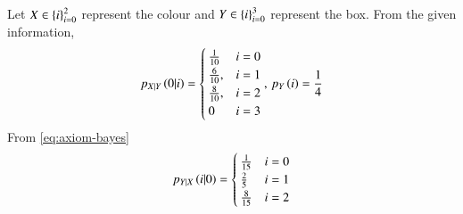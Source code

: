 Let $X\in\left\{i\right\}_{i=0}^{2}$ represent the colour and
$Y\in\left\{i\right\}_{i=0}^{3}$ represent the box.
From the given information,
\begin{align}
	p_{X|Y}\left(0|i\right)=
	\begin{cases}
		\frac{1}{10} & i=0\\
\frac{6}{10},& i=1\\
\frac{8}{10},& i=2\\
0& i=3
\end{cases}
,\,
	p_{Y}\left(i\right)=\frac{1}{4}
\end{align}
From \eqref{eq:axiom-bayes}
\begin{align}
p_{Y|X}\left(i|0\right) = 
\begin{cases}
	\frac{1}{15} & i = 0 \\
	\frac{2}{5} & i = 1 \\
	\frac{8}{15} & i = 2 
\end{cases}
\end{align}

